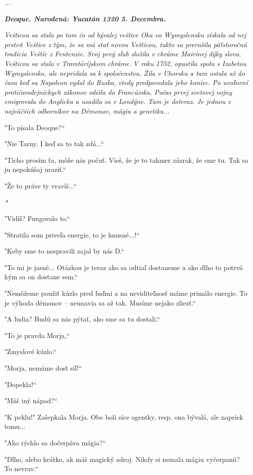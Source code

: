 \documentclass{book}
\begin{document}
\textit{...}

\textbf{\textit{Deoque. Narodená: Yucatán 1320 5. Decembra. }}

\textit{Vešticou sa stala po tom čo od bývalej veštice Oka vo Wymyslensku získala od nej prsteň Veštice z tým, že sa má stať novou Vešticou, takto sa prerušila päťstoročná tradícia Veštíc z Fentenzie. Svoj prvý sľub zložila v chráme Mairinej dýky slova. Vešticou sa stala v Tramtáríjskom chráme.
}
\textit{V roku 1752, opustila spolu s Izabetou Wymyslensko, ale nepridala sa k spoločenstvu. Žila v Uhorsku a tam ostala až do času keď sa Napoleon vydal do Ruska, vtedy predpovedala jeho koniec. Po uvoľnení protičarodejníckych zákonov odišla do Francúzska. Počas prvej svetovej vojny emigrovala do Anglicka a usadila sa v Londýne. Tam je doteraz. Je jednou z najväčších odborníkov na Démonov, mágiu a genetiku...}

"To písala Deoque?“

"Nie Tarny. I keď sa to tak zdá...“

"Ticho prosím ťa, môže nás počuť. Vieš, že je to takmer zázrak, že sme tu. Tak sa ju nepokúšaj uraziť.“

"Že to práve ty vravíš...“

\textit{*}

"Vidíš? Fungovalo to.“

"Stratila som priveľa energie, to je hnusné...!“

"Keby sme to nespravili zajal by nás D.“

"To mi je jasné... Otázkou je teraz ako sa odtiaľ dostaneme a ako dlho to potrvá kým sa on dostane sem.“

"Nemôžeme použiť kúzlo pred ľuďmi a na neviditeľnosť máme primálo energie. To je výhoda démonov – neunavia sa až tak. Musíme nejako zliezť.“

"$ $A ľudia? Budú sa nás pýtať, ako sme sa tu dostali.“

"To je pravda Morja,“

"Zmyslové kúzlo.“

"Morja, nemáme dosť síl!“

"Dopekla!“

"Máš iný nápad?“

"K peklu!"$ $ Zašepkala Morja. Obe boli síce agentky, resp. ona bývalá, ale napriek tomu...

"$ $Ako rýchlo sa dočerpáva mágia?“

"Dlho, alebo krátko, ak máš magický zdroj. Nikdy si nemala mágiu vyčerpanú? To nevrav.“
\end{document}
